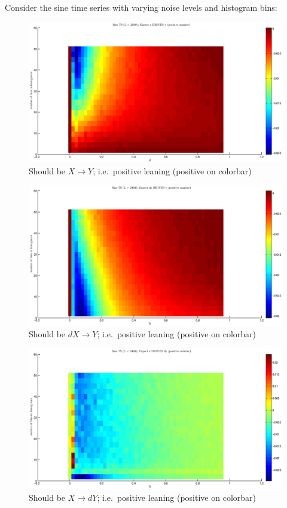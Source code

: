 \documentclass[a4paper,11pt]{article}
\begin{document}
Consider the sine time series with varying noise levels and histogram bins:
\begin{figure}[!H]
\includegraphics[scale=0.55]{SineTSxy.eps}
\caption{Should be $X\rightarrow Y$; i.e.\ positive leaning (positive on colorbar)}
\end{figure}
\begin{figure}[!H]
\includegraphics[scale=0.55]{SineTSdxy.eps}
\caption{Should be $dX\rightarrow Y$; i.e.\ positive leaning (positive on colorbar)}
\end{figure}
\begin{figure}[!H]
\includegraphics[scale=0.55]{SineTSxdy.eps}
\caption{Should be $X\rightarrow dY$; i.e.\ positive leaning (positive on colorbar)}
\end{figure}
\end{document}
